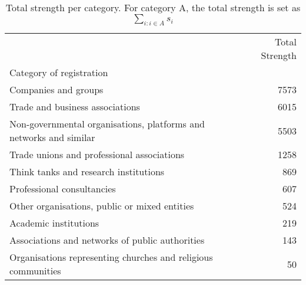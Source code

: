 \documentclass[ 11pt]{article}
\begin{document}
 \begin{table}
 \centering
\begin{tabular}{lr}
\toprule
 & Total Strength \\
Category of registration &  \\
\midrule
Companies and groups & 7573 \\
Trade and business associations & 6015 \\
Non-governmental organisations, platforms and networks and similar & 5503 \\
Trade unions and professional associations & 1258 \\
Think tanks and research institutions & 869 \\
Professional consultancies & 607 \\
Other organisations, public or mixed entities & 524 \\
Academic institutions & 219 \\
Associations and networks of public authorities & 143 \\
Organisations representing churches and religious communities & 50 \\
\bottomrule
\end{tabular}
 \caption{Total strength per category. For category A, the total strength is set as $\sum_{i : i \in A } s_i$}\label{tab: s_i_vs_cat}
   \end{table}
   
    \newpage
    \printbibliography
   
\end{document}
